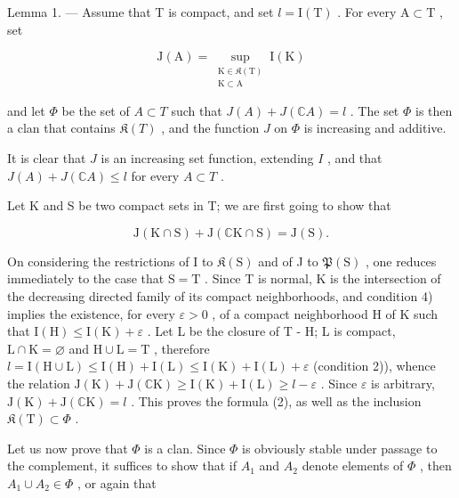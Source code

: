 Lemma 1. --- Assume that T is compact, and set \(l = \mathrm{I}(\mathrm{T})\) . For every \(\mathrm{A} \subset \mathrm{T}\) , set

\[
\mathrm{J}(\mathrm{A}) = \sup_{\substack{\mathrm{K}\in \mathfrak{K}(\mathrm{T})\\ \mathrm{K}\subset \mathrm{A}}}\mathrm{I}(\mathrm{K})\tag{1}
\]

and let \(\Phi\) be the set of \(A \subset T\) such that \(J(A) + J(\mathbb{C}A) = l\) . The set \(\Phi\) is then a clan that contains \(\mathfrak{K}(T)\) , and the function \(J\) on \(\Phi\) is increasing and additive.

It is clear that \(J\) is an increasing set function, extending \(I\) , and that \(J(A) + J(\mathbb{C}A) \leqslant l\) for every \(A \subset T\) .

Let K and S be two compact sets in T; we are first going to show that

\[
\mathrm{J} (\mathrm{K} \cap \mathrm{S}) + \mathrm{J} (\mathbb {C} \mathrm{K} \cap \mathrm{S}) = \mathrm{J} (\mathrm{S}).\tag{2}
\]

On considering the restrictions of I to \(\mathfrak{K}(\mathrm{S})\) and of J to \(\mathfrak{P}(\mathrm{S})\) , one reduces immediately to the case that \(\mathrm{S} = \mathrm{T}\) . Since T is normal, K is the intersection of the decreasing directed family of its compact neighborhoods, and condition 4) implies the existence, for every \(\varepsilon > 0\) , of a compact neighborhood H of K such that \(\mathrm{I}(\mathrm{H}) \leqslant \mathrm{I}(\mathrm{K}) + \varepsilon\) . Let L be the closure of T - H; L is compact, \(\mathrm{L} \cap \mathrm{K} = \varnothing\) and \(\mathrm{H} \cup \mathrm{L} = \mathrm{T}\) , therefore \(l = \mathrm{I}(\mathrm{H} \cup \mathrm{L}) \leqslant \mathrm{I}(\mathrm{H}) + \mathrm{I}(\mathrm{L}) \leqslant \mathrm{I}(\mathrm{K}) + \mathrm{I}(\mathrm{L}) + \varepsilon\) (condition 2)), whence the relation \(\mathrm{J}(\mathrm{K}) + \mathrm{J}(\mathbb{C}\mathrm{K}) \geqslant \mathrm{I}(\mathrm{K}) + \mathrm{I}(\mathrm{L}) \geqslant l - \varepsilon\) . Since \(\varepsilon\) is arbitrary, \(\mathrm{J}(\mathrm{K}) + \mathrm{J}(\mathbb{C}\mathrm{K}) = l\) . This proves the formula (2), as well as the inclusion \(\mathfrak{K}(\mathrm{T}) \subset \Phi\) .

Let us now prove that \(\Phi\) is a clan. Since \(\Phi\) is obviously stable under passage to the complement, it suffices to show that if \(A_{1}\) and \(A_{2}\) denote elements of \(\Phi\) , then \(A_{1} \cup A_{2} \in \Phi\) , or again that

